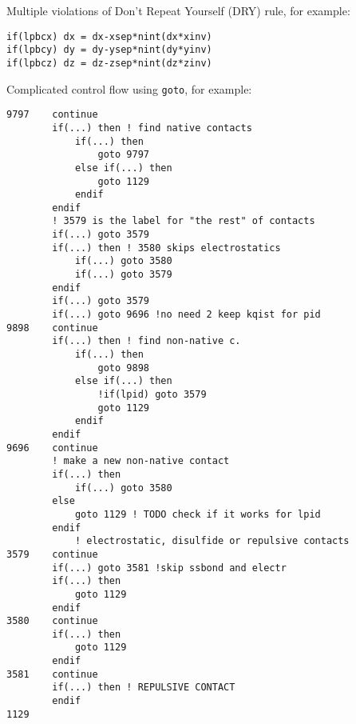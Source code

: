 \begin{itemize}
    \item Multiple violations of Don't Repeat Yourself (DRY) rule, for example:
    \begin{lstlisting}[title=This snippet appears 14 times]    
if(lpbcx) dx = dx-xsep*nint(dx*xinv)
if(lpbcy) dy = dy-ysep*nint(dy*yinv)
if(lpbcz) dz = dz-zsep*nint(dz*zinv)
    \end{lstlisting}
    
    
    \begin{minipage}{\linewidth}
    \item Complicated control flow using \texttt{goto}, for example:
    \begin{lstlisting}[title=Control flow structure of the main part of \texttt{update\_verlet\_list} subroutine]
9797    continue
        if(...) then ! find native contacts
            if(...) then
                goto 9797
            else if(...) then
                goto 1129
            endif
        endif
        ! 3579 is the label for "the rest" of contacts
        if(...) goto 3579
        if(...) then ! 3580 skips electrostatics
            if(...) goto 3580
            if(...) goto 3579
        endif
        if(...) goto 3579
        if(...) goto 9696 !no need 2 keep kqist for pid
9898    continue
        if(...) then ! find non-native c.
            if(...) then
                goto 9898
            else if(...) then
                !if(lpid) goto 3579
                goto 1129
            endif
        endif
9696    continue
        ! make a new non-native contact
        if(...) then
            if(...) goto 3580
        else
            goto 1129 ! TODO check if it works for lpid
        endif
            ! electrostatic, disulfide or repulsive contacts
3579    continue
        if(...) goto 3581 !skip ssbond and electr
        if(...) then
            goto 1129
        endif
3580    continue
        if(...) then
            goto 1129
        endif
3581    continue
        if(...) then ! REPULSIVE CONTACT
        endif
1129               
    \end{lstlisting}
    \end{minipage}
\end{itemize}


